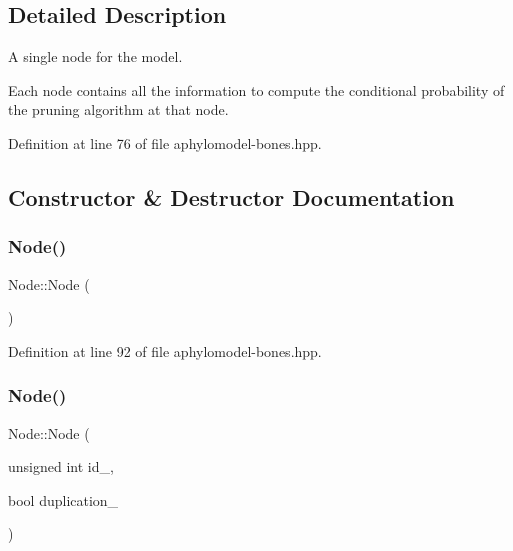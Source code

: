 

\subsection{Detailed Description}
A single node for the model. 

Each node contains all the information to compute the conditional probability of the pruning algorithm at that node. 

Definition at line 76 of file aphylomodel-\/bones.\+hpp.



\subsection{Constructor \& Destructor Documentation}
\mbox{\label{class_node_ad7a34779cad45d997bfd6d3d8043c75f}} 
\subsubsection{\texorpdfstring{Node()}{Node()}\hspace{0.1cm}{\footnotesize\ttfamily [1/3]}}
{\footnotesize\ttfamily Node\+::\+Node (\begin{DoxyParamCaption}{ }\end{DoxyParamCaption})\hspace{0.3cm}{\ttfamily [inline]}}



Definition at line 92 of file aphylomodel-\/bones.\+hpp.

\mbox{\label{class_node_affbe0c59bdcfd5e8068d50b49742cff6}} 
\subsubsection{\texorpdfstring{Node()}{Node()}\hspace{0.1cm}{\footnotesize\ttfamily [2/3]}}
{\footnotesize\ttfamily Node\+::\+Node (\begin{DoxyParamCaption}\item[{unsigned int}]{id\+\_\+,  }\item[{bool}]{duplication\+\_\+ }\end{DoxyParamCaption})\hspace{0.3cm}{\ttfamily [inline]}}



